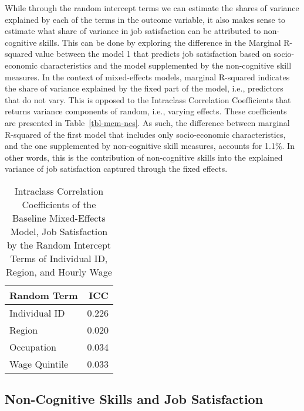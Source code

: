 \documentclass[
]{interact}
\begin{document}
While through the random intercept terms we can estimate the shares of
variance explained by each of the terms in the outcome variable, it also
makes sense to estimate what share of variance in job satisfaction can
be attributed to non-cognitive skills. This can be done by exploring the
difference in the Marginal R-squared value between the model 1 that
predicts job satisfaction based on socio-economic characteristics and
the model supplemented by the non-cognitive skill measures. In the
context of mixed-effects models, marginal R-squared indicates the share
of variance explained by the fixed part of the model, i.e., predictors
that do not vary. This is opposed to the Intraclass Correlation
Coefficients that returns variance components of random, i.e., varying
effects. These coefficients are presented in Table~\ref{tbl-mem-ncs}. As
such, the difference between marginal R-squared of the first model that
includes only socio-economic characteristics, and the one supplemented
by non-cognitive skill measures, accounts for 1.1\%. In other words,
this is the contribution of non-cognitive skills into the explained
variance of job satisfaction captured through the fixed effects.

\begin{longtable}[]{@{}lr@{}}

\caption{\label{tbl-icc-baseline}Intraclass Correlation Coefficients of
the Baseline Mixed-Effects Model, Job Satisfaction by the Random
Intercept Terms of Individual ID, Region, and Hourly Wage}

\tabularnewline

\toprule\noalign{}
Random Term & ICC \\
\midrule\noalign{}
\endhead
\bottomrule\noalign{}
\endlastfoot
Individual ID & 0.226 \\
Region & 0.020 \\
Occupation & 0.034 \\
Wage Quintile & 0.033 \\

\end{longtable}

\subsection{Non-Cognitive Skills and Job
Satisfaction}\label{non-cognitive-skills-and-job-satisfaction}
\end{document}
